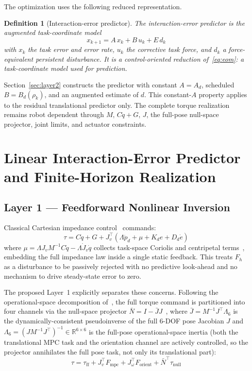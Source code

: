 \documentclass[journal]{IEEEtran}
\newtheorem{definition}{Definition}
\newcommand{\Fmpc}{F_{\text{mpc}}}
\newcommand{\Nbar}{\bar{N}}
\begin{document}
The optimization uses the following reduced representation.
\begin{definition}[Interaction-error predictor]\label{def:id}
The \emph{interaction-error predictor} is the augmented task-coordinate model
\[
  x_{k+1} = A\,x_k + B\,u_k + E\,d_k
\]
with $x_k$ the task error and error rate, $u_k$ the corrective task force, and
$d_k$ a force-equivalent persistent disturbance. It is a control-oriented
reduction of~\eqref{eq:eom}: a task-coordinate model used for prediction.
\end{definition}

Section~\ref{sec:layer2} constructs the predictor with constant
$A=A_d$, scheduled $B=B_d(\rho_k)$, and an augmented estimate of $d$. This
constant-$A$ property applies to the residual translational predictor only.
The complete torque realization remains robot dependent through
$M$, $C\dot q+G$, $J$, the full-pose null-space projector, joint limits, and
actuator constraints.

\section{Linear Interaction-Error Predictor and Finite-Horizon Realization}

\subsection{Layer 1 --- Feedforward Nonlinear Inversion}
\label{sec:layer1}

Classical Cartesian impedance control~\cite{hogan1985impedance} commands:
\begin{equation*}
  \tau = C\dot{q}+G+J_v^\top(\Lambda\ddot{p}_d+\mu+K_de+D_d\dot{e})
\end{equation*}
where $\mu=\Lambda J_vM^{-1}C\dot{q}-\Lambda\dot{J}_v\dot{q}$ collects
task-space Coriolis and centripetal terms~\cite{khatib1987unified},
embedding the full impedance law inside a single static feedback.
This treats $F_h$ as a disturbance to be passively rejected with no
predictive look-ahead and no mechanism to drive steady-state error to
zero.

The proposed Layer~1 explicitly separates these concerns.
Following the operational-space decomposition of~\cite{khatib1987unified},
the full torque command is partitioned into four channels via the
null-space projector $\Nbar=I-\bar{J}J$~\cite{sentis2005synthesis}, where
$\bar{J}=M^{-1}J^\top\Lambda_6$ is the dynamically-consistent pseudoinverse
of the full $6$-DOF pose Jacobian $J$ and
$\Lambda_6=(JM^{-1}J^\top)^{-1}\in\mathbb{R}^{6\times6}$ is the full-pose
operational-space inertia (both the translational MPC task and the
orientation channel are actively controlled, so the projector annihilates
the full pose task, not only its translational part):
\begin{equation}\label{eq:tau}
  \tau = \tau_{\text{ff}}+J_v^\top\Fmpc
        +J_\omega^\top F_{\text{orient}}+\Nbar^\top\tau_{\text{null}}
\end{equation}
\end{document}
